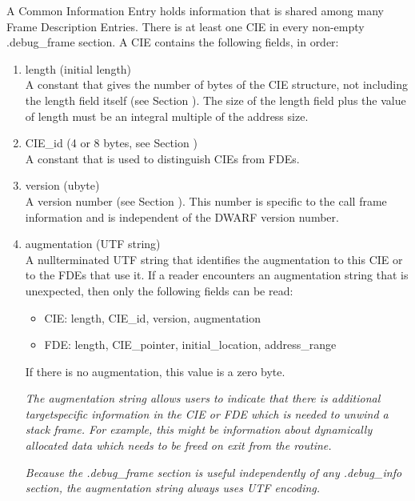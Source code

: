 A Common Information Entry holds information that is shared
among many Frame Description Entries. There is at least one
CIE in every non-empty .debug\_frame section. A CIE contains
the following fields, in order:

\begin{enumerate}[1.]
\item length (initial length)  \\
A constant that gives the number of bytes of the CIE structure,
not including the length field itself 
(see Section ). 
The
size of the length field plus the value of length must be an
integral multiple of the address size.

\item  CIE\_id (4 or 8 bytes, see Section ) \\
A constant that is used to distinguish CIEs from FDEs.

\item  version (ubyte) \\
A version number 
(see Section ). 
This number is specific to the call frame information
and is independent of the DWARF version number.


\item  augmentation (UTF string) \\
A null\dash terminated UTF string that identifies the augmentation
to this CIE or to the FDEs that use it. If a reader encounters
an augmentation string that is unexpected, then only the
following fields can be read:


\begin{itemize}

\item CIE: length, CIE\_id, version, augmentation

\item FDE: length, CIE\_pointer, initial\_location, address\_range

\end{itemize}
If there is no augmentation, this value is a zero byte.

\textit{The augmentation string allows users to indicate that there
is additional target\dash specific information in the CIE or FDE
which is needed to unwind a stack frame. For example, this
might be information about dynamically allocated data which
needs to be freed on exit from the routine.}

\textit{Because the .debug\_frame section is useful independently of
any .debug\_info section, the augmentation string always uses
UTF encoding.}


\end{enumerate}
